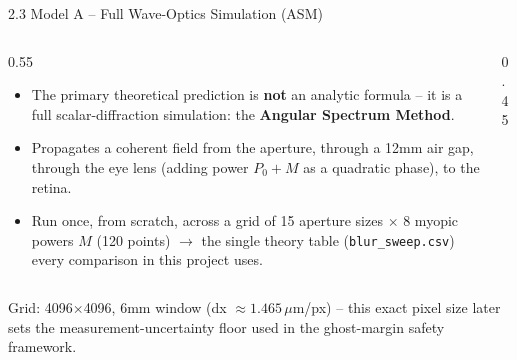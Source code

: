 \documentclass[aspectratio=169]{beamer}
\begin{document}
\begin{frame}{2.3 Model A -- Full Wave-Optics Simulation (ASM)}
  \begin{columns}
    \begin{column}{0.55\textwidth}
      \begin{itemize}
        \item The primary theoretical prediction is \textbf{not} an analytic
          formula -- it is a full scalar-diffraction simulation: the
          \textbf{Angular Spectrum Method}.
        \item Propagates a coherent field from the aperture, through a 12mm
          air gap, through the eye lens (adding power $P_0+M$ as a quadratic
          phase), to the retina.
        \item Run once, from scratch, across a grid of 15 aperture sizes
          $\times$ 8 myopic powers $M$ (120 points) $\to$ the single theory
          table (\texttt{blur\_sweep.csv}) every comparison in this project uses.
      \end{itemize}
    \end{column}
    \begin{column}{0.45\textwidth}
      \centering
    \end{column}
  \end{columns}
  \vspace{0.2cm}
  \small Grid: 4096$\times$4096, 6mm window (dx $\approx1.465\,\mu$m/px) --
  this exact pixel size later sets the measurement-uncertainty floor used in
  the ghost-margin safety framework.
\end{frame}
\end{document}
